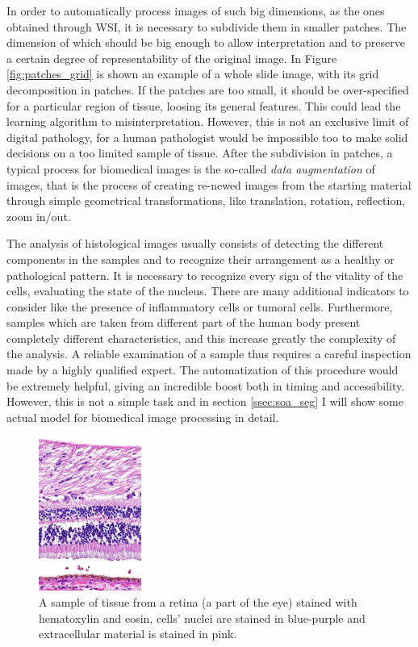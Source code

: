     In order to automatically process images of such big dimensions, as the ones obtained through WSI, it is necessary to subdivide them in smaller patches. The dimension of which should be big enough to allow interpretation and to preserve a certain degree of representability of the original image. In Figure \ref{fig:patches_grid} is shown an example of a whole slide image, with its grid decomposition in patches. If the patches are too small, it should be over-specified for a particular region of tissue, loosing its general features. This could lead the learning algorithm to misinterpretation. However, this is not an exclusive limit of digital pathology, for a human pathologist would be impossible too to make solid decisions on a too limited sample of tissue. After the subdivision in patches, a typical process for biomedical images is the so-called \textit{data augmentation} of images, that is the process of creating re-newed images from the starting material through simple geometrical transformations, like translation, rotation, reflection, zoom in/out.

    The analysis of histological images usually consists of detecting the different components in the samples and to recognize their arrangement as a healthy or pathological pattern. It is necessary to recognize every sign of the vitality of the cells, evaluating the state of the nucleus. There are many additional indicators to consider like the presence of inflammatory cells or tumoral cells. Furthermore, samples which are taken from different part of the human body present completely different characteristics, and this increase greatly the complexity of the analysis.
    A reliable examination of a sample thus requires a careful inspection made by a highly qualified expert. The automatization of this procedure would be extremely helpful, giving an incredible boost both in timing and accessibility. However, this is not a simple task and in section \ref{ssec:soa_seg} I will show some actual model for biomedical image processing in detail.

     \begin{figure}
         \centering
         \includegraphics[width = 0.3\textwidth]{images/h&e_retyna}
         \caption{A sample of tissue from a retina (a part of the eye) stained with hematoxylin and eosin, cells' nuclei are stained in blue-purple and extracellular material is stained in pink.}
         \label{fig:he_retyna}
     \end{figure}

